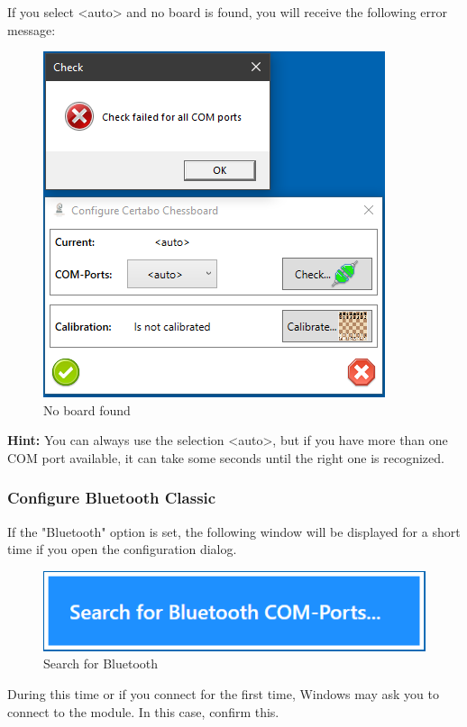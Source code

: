 \documentclass[11pt,a4paper]{article}
\begin{document}
If you select <auto> and no board is found, you will receive the following error message:

\begin{figure}[H]
	\centering
	\includegraphics[scale=0.9]{Calibrate3.png}
	\caption{No board found }
	\label{fig:Calibrate3}
\end{figure}

\textbf{Hint:} You can always use the selection <auto>, but if you have more than one COM port available, it can take some seconds until the right one is recognized.


\subsubsection{Configure Bluetooth Classic} \label{CertaboBluetooth}

If the "Bluetooth" option is set, the following window will be displayed for a short time if you open the configuration dialog.

\begin{figure}[H]
	\centering
	\includegraphics[scale=0.8]{MillenniumChessLink10.png}
	\caption{Search for Bluetooth}
	\label{fig:CertaboBT10}
\end{figure}

During this time or if you connect for the first time, Windows may ask you to connect to the module. In this case, confirm this. 
\end{document}
